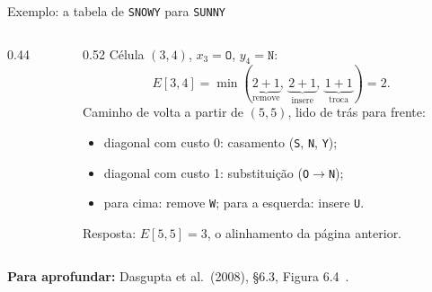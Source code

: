 \documentclass[aspectratio=169,xcolor=table]{beamer}
\newcommand{\gradePD}[3]{%
  \foreach \y [count=\j from 1] in #2
    \node[font=\tiny\ttfamily\bfseries, gray!60!black] at ({\j*0.55},0.36) {\y};
  \foreach \x [count=\i from 1] in #1
    \node[font=\tiny\ttfamily\bfseries, gray!60!black] at (-0.45,{-\i*0.36}) {\x};
  \foreach \lin [count=\i from 0] in #3
    \foreach \v [count=\j from 0] in \lin
      \node[cel] at ({\j*0.55},{-\i*0.36}) {\v};%
}
\newcommand{\marca}[3]{\fill[#3] ({#2*0.55-0.275},{-#1*0.36-0.18}) rectangle +(0.55,0.36);}
\newcommand{\passo}[4]{\draw[-{Stealth[length=1.3mm]}, red!70!black, semithick, shorten <=1.5mm, shorten >=1.5mm]
  ({#2*0.55},{-#1*0.36}) -- ({#4*0.55},{-#3*0.36});}
\newcommand{\rotS}{S,N,O,W,Y}
\newcommand{\rotU}{S,U,N,N,Y}
\newcommand{\valoresE}{{0,1,2,3,4,5},{1,0,1,2,3,4},{2,1,1,1,2,3},{3,2,2,2,2,3},%
  {4,3,3,3,3,3},{5,4,4,4,4,3}}
\newcommand{\fonte}[1]{%
  \vfill
  {\tiny\color{gray!55!black}\textbf{Para aprofundar:} #1\par}%
}
\begin{document}
\begin{frame}{Exemplo: a tabela de \texttt{SNOWY} para \texttt{SUNNY}}
  \begin{columns}[c]
    \begin{column}{0.44\textwidth}
      \centering
    \end{column}
    \begin{column}{0.52\textwidth}
      \scriptsize Célula $(3,4)$, $x_3=\texttt{O}$, $y_4=\texttt{N}$:
      \[ E[3,4] = \min(\underbrace{2{+}1}_{\text{remove}},\ \underbrace{2{+}1}_{\text{insere}},\ \underbrace{1{+}1}_{\text{troca}}) = 2. \]
      Caminho de volta a partir de $(5,5)$, lido de trás para frente:
      \begin{itemize}\scriptsize
        \item diagonal com custo 0: casamento (\texttt{S}, \texttt{N}, \texttt{Y});
        \item diagonal com custo 1: substituição (\texttt{O}$\to$\texttt{N});
        \item para cima: remove \texttt{W}; para a esquerda: insere \texttt{U}.
      \end{itemize}
      Resposta: $E[5,5] = 3$, o alinhamento da página anterior.
    \end{column}
  \end{columns}
  \fonte{Dasgupta et al.\ (2008), \S 6.3, Figura 6.4~\cite{dasgupta2008algorithms}.}
\end{frame}
\end{document}
